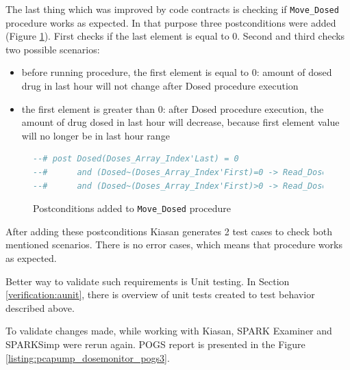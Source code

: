The last thing which was improved by code contracts is checking if \lstinline{Move_Dosed} procedure works as expected. In that purpose three postconditions were added (Figure \ref{listing:postconditions_added_to_move_dosed}). First checks if the last element is equal to 0. Second and third checks two possible scenarios: 
\begin{itemize}
    \item before running procedure, the first element is equal to 0: amount of dosed drug in last hour will not change after Dosed procedure execution
    \item the first element is greater than 0: after Dosed procedure execution, the amount of drug dosed in last hour will decrease, because first element value will no longer be in last hour range
\end{itemize}

\begin{figure}
\singlespacing
\begin{lstlisting}[language=ada, frame=single, gobble=0]
--# post Dosed(Doses_Array_Index'Last) = 0 
--#      and (Dosed~(Doses_Array_Index'First)=0 -> Read_Dosed(Dosed~) = Read_Dosed(Dosed))
--#      and (Dosed~(Doses_Array_Index'First)>0 -> Read_Dosed(Dosed~) > Read_Dosed(Dosed));
\end{lstlisting}
\doublespacing
\caption{Postconditions added to \lstinline{Move_Dosed} procedure}
\label{listing:postconditions_added_to_move_dosed}
\end{figure}

After adding these postconditions Kiasan generates 2 test cases to check both mentioned scenarios. There is no error cases, which means that procedure works as expected. 

Better way to validate such requirements is Unit testing. In Section \ref{verification:aunit}, there is overview of unit tests created to test behavior described above.

To validate changes made, while working with Kiasan, SPARK Examiner and SPARKSimp were rerun again. POGS report is presented in the Figure \ref{listing:pcapump_dosemonitor_pogs3}.

